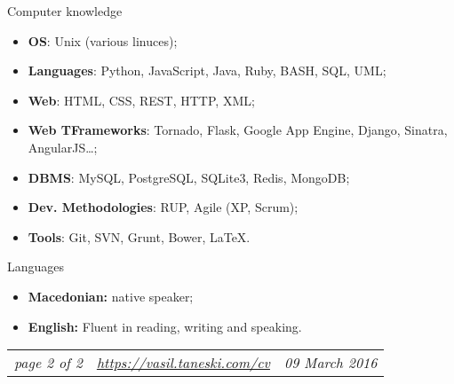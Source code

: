 \documentclass[]{mcdowellcv}
\begin{document}
    \begin{cvsection}{Computer knowledge}
    \label{Computer knowledge}
        \begin{cvsubsection}{}{}{}
            \begin{itemize}
                \item \textbf{OS}: Unix (various linuces);
                \item \textbf{Languages}: Python, JavaScript, Java, Ruby, BASH, SQL, UML;
                \item \textbf{Web}: HTML, CSS, REST, HTTP, XML;
                \item \textbf{Web TFrameworks}: Tornado, Flask, Google App Engine, Django, Sinatra, AngularJS\ldots;
                \item \textbf{DBMS}: MySQL, PostgreSQL, SQLite3, Redis, MongoDB;
                \item \textbf{Dev. Methodologies}: RUP, Agile (XP, Scrum);
                \item \textbf{Tools}: Git, SVN, Grunt, Bower, \LaTeX.
            \end{itemize}
        \end{cvsubsection}
    \end{cvsection}

    \begin{cvsection}{Languages}
    \label{Languages}
        \begin{cvsubsection}{}{}{}
            \begin{itemize}
                \item \textbf{Macedonian:} native speaker;
                \item \textbf{English:} Fluent in reading, writing and speaking.
            \end{itemize}
        \end{cvsubsection}
    \end{cvsection}
    \vfill
    \begin{tabu} to 1\textwidth { X[l,m] X[c,m] X[r,m] }
        \textit{page 2 of 2} & \textit{ \url{https://vasil.taneski.com/cv} } & \textit{09 March 2016}
    \end{tabu}
    \clearpage
\end{document}
